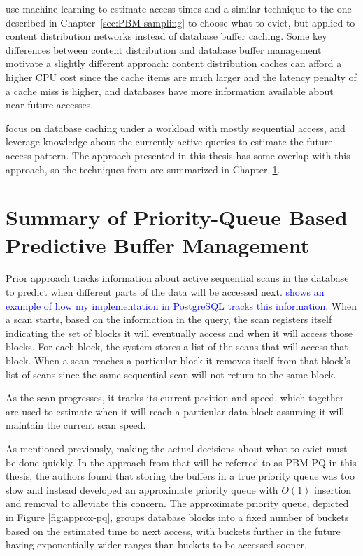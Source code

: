 \citet{relaxedBelady} use machine learning to estimate access times and a similar technique to the one described in Chapter~\ref{sec:PBM-sampling} to choose what to evict, but applied to content distribution networks instead of database buffer caching. Some key differences between content distribution and database buffer management motivate a slightly different approach: content distribution caches can afford a higher CPU cost since the cache items are much larger and the latency penalty of a cache miss is higher, and databases have more information available about near-future accesses.

\citet{pbm} focus on database caching under a workload with mostly sequential access, and leverage knowledge about the currently active queries to estimate the future access pattern. The approach presented in this thesis has some overlap with this approach, so the techniques from \cite{pbm} are summarized in Chapter~\ref{sec:pbm-pq_summary}.

\section{Summary of Priority-Queue Based Predictive Buffer Management}
\label{sec:pbm-pq_summary}

Prior approach \cite{pbm} tracks information about active sequential scans in the database to predict when different parts of the data will be accessed next. \textcolor{blue}{ shows an example of how my implementation in PostgreSQL tracks this information.} When a scan starts, based on the information in the query, the scan registers itself indicating the set of blocks it will eventually access and when it will access those blocks. For each block, the system stores a list of the scans that will access that block. When a scan reaches a particular block it removes itself from that block's list of scans since the same sequential scan will not return to the same block.

As the scan progresses, it tracks its current position and speed, which together are used to estimate when it will reach a particular data block assuming it will maintain the current scan speed.

As mentioned previously, making the actual decisions about what to evict must be done quickly. In the approach from \cite{pbm} that will be referred to as PBM-PQ in this thesis, the authors found that storing the buffers in a true priority queue was too slow and instead developed an approximate priority queue with $O(1)$ insertion and removal to alleviate this concern. The approximate priority queue, depicted in Figure \ref{fig:approx-pq}, groups database blocks into a fixed number of buckets based on the estimated time to next access, with buckets further in the future having exponentially wider ranges than buckets to be accessed sooner.

